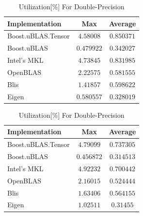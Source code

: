 \begin{table}[ht]
    \centering
    \caption{Utilization[\%] For Single-Precision}
    \begin{tabular}{|l|c|c|}
        \hline
        \textbf{Implementation} & \textbf{Max} & \textbf{Average}\\
        \hline
        Boost.uBLAS.Tensor  & $4.58008$ & $0.850371$ \\
        \hline
        Boost.uBLAS         & $0.479922$ & $0.342027$ \\
        \hline
        Intel's MKL         & $4.73845$ & $0.831985$ \\
        \hline
        OpenBLAS            & $2.22575$ & $0.581555$ \\
        \hline
        Blis                & $1.41857$ & $0.598622$ \\
        \hline
        Eigen               & $0.580557$ & $0.328019$ \\
        \hline
    \end{tabular}

    \vspace*{1 cm}

    \centering
    \caption{Utilization[\%] For Double-Precision}
    \begin{tabular}{|l|c|c|}
        \hline
        \textbf{Implementation} & \textbf{Max} & \textbf{Average}\\
        \hline
        Boost.uBLAS.Tensor  & $4.79099$ & $0.737305$ \\
        \hline
        Boost.uBLAS         & $0.456872$ & $0.314513$ \\
        \hline
        Intel's MKL         & $4.92232$ & $0.700442$ \\
        \hline
        OpenBLAS            & $2.16015$ & $0.524444$ \\
        \hline
        Blis                & $1.63406$ & $0.564155$ \\
        \hline
        Eigen               & $1.02511$ & $0.31455$ \\
        \hline
    \end{tabular}
\end{table}

